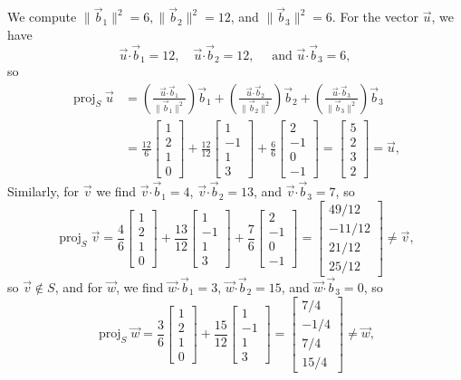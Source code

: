 \documentclass[12pt]{article}
\newcommand{\len}[1]{\lVert #1\rVert}
\newcommand{\dotp}{\boldsymbol{\cdot}}
\newcommand{\bbm}{\begin{bmatrix}}
\newcommand{\ebm}{\end{bmatrix}}
\DeclareMathOperator{\proj}{proj}
\begin{document}
\begin{enumerate}
\begin{enumerate}
We compute $\len{\vec{b}_1}^2 = 6, \len{\vec{b}_2}^2 = 12$, and $\len{\vec{b}_3}^2 = 6$. For the vector $\vec{u}$, we have
\[
\vec{u}\dotp\vec{b}_1 = 12, \quad \vec{u}\dotp\vec{b}_2 = 12, \quad \text{ and } \vec{u}\dotp\vec{b}_3 = 6,
\]
so
\begin{align*}
 \proj_S\vec{u} &= \left(\frac{\vec{u}\dotp \vec{b}_1}{\len{\vec{b}_1}^2}\right)\vec{b}_1+\left(\frac{\vec{u}\dotp \vec{b}_2}{\len{\vec{b}_2}^2}\right)\vec{b}_2+\left(\frac{\vec{u}\dotp \vec{b}_3}{\len{\vec{b}_3}^2}\right)\vec{b}_3\\
& = \frac{12}{6}\bbm 1\\2\\1\\0\ebm+\frac{12}{12}\bbm 1\\-1\\1\\3\ebm +\frac{6}{6}\bbm 2\\-1\\0\\-1\ebm = \bbm 5\\2\\3\\2\ebm = \vec{u},
\end{align*}
Similarly, for $\vec{v}$ we find $\vec{v}\dotp \vec{b}_1 = 4$, $\vec{v}\dotp \vec{b}_2 = 13$, and $\vec{v}\dotp \vec{b}_3 = 7$, so
\[
 \proj_S\vec{v} = \frac{4}{6}\bbm 1\\2\\1\\0\ebm + \frac{13}{12}\bbm 1\\-1\\1\\3\ebm + \frac{7}{6}\bbm 2\\-1\\0\\-1\ebm = \bbm 49/12\\-11/12\\21/12\\25/12\ebm \neq \vec{v},
\]
so $\vec{v}\notin S$, and for $\vec{w}$, we find $\vec{w}\dotp \vec{b}_1 = 3$, $\vec{w}\dotp \vec{b}_2 = 15$, and $\vec{w}\dotp \vec{b}_3 = 0$, so
\[
 \proj_S\vec{w} = \frac{3}{6}\bbm 1\\2\\1\\0\ebm + \frac{15}{12}\bbm 1\\-1\\1\\3\ebm = \bbm 7/4\\-1/4\\7/4\\15/4\ebm \neq \vec{w},
\]
\end{enumerate}
\end{enumerate}
\end{document}
